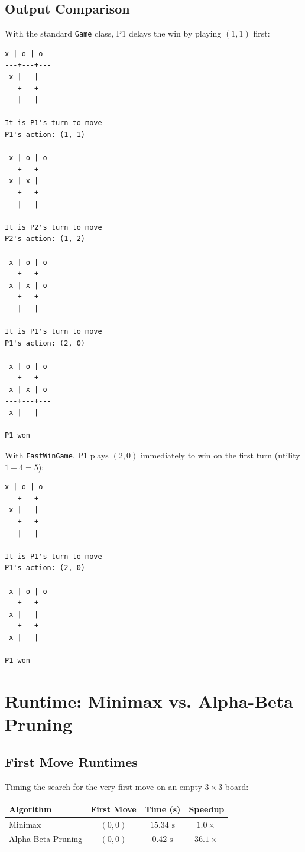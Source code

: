 \documentclass[11pt,a4paper]{article}
\begin{document}
\subsection{Output Comparison}
With the standard \texttt{Game} class, P1 delays the win by playing $(1, 1)$ first:
\begin{lstlisting}[style=terminaloutput]
 x | o | o
---+---+---
 x |   |  
---+---+---
   |   |  

It is P1's turn to move
P1's action: (1, 1)

 x | o | o
---+---+---
 x | x |  
---+---+---
   |   |  

It is P2's turn to move
P2's action: (1, 2)

 x | o | o
---+---+---
 x | x | o
---+---+---
   |   |  

It is P1's turn to move
P1's action: (2, 0)

 x | o | o
---+---+---
 x | x | o
---+---+---
 x |   |  

P1 won
\end{lstlisting}

With \texttt{FastWinGame}, P1 plays $(2, 0)$ immediately to win on the first turn (utility $1 + 4 = 5$):
\begin{lstlisting}[style=terminaloutput]
 x | o | o
---+---+---
 x |   |  
---+---+---
   |   |  

It is P1's turn to move
P1's action: (2, 0)

 x | o | o
---+---+---
 x |   |  
---+---+---
 x |   |  

P1 won
\end{lstlisting}

\section{Runtime: Minimax vs. Alpha-Beta Pruning}

\subsection{First Move Runtimes}
Timing the search for the very first move on an empty $3 \times 3$ board:

\begin{table}[htbp]
\centering
\begin{tabular}{lccc}
\toprule
\textbf{Algorithm} & \textbf{First Move} & \textbf{Time (s)} & \textbf{Speedup} \\
\midrule
Minimax            & $(0, 0)$            & $15.34\text{ s}$  & $1.0\times$ \\
Alpha-Beta Pruning & $(0, 0)$            & $0.42\text{ s}$   & $\mathbf{36.1\times}$ \\
\bottomrule
\end{tabular}
\end{table}
\end{document}

